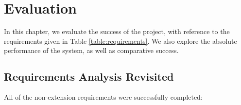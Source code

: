 \documentclass[oneside, class=book, 12pt, crop=false]{standalone}
\begin{document}
\ifstandalone
  \setcounter{chapter}{3}
  \chapter{Evaluation}
\fi
{}

In this chapter, we evaluate the success of the project, with reference to the requirements given in Table \ref{table:requirements}. We also explore the absolute performance of the system, as well as comparative success. 

\section{Requirements Analysis Revisited}

All of the non-extension requirements were successfully completed:
\end{document}
